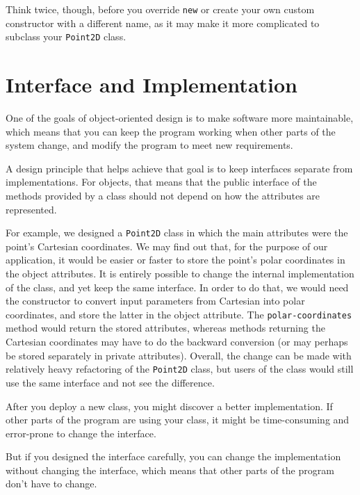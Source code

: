 Think twice, though, before you override {\tt new} or create your 
own custom constructor with a different name, as it may make it 
more complicated to subclass your {\tt Point2D} class.



\section{Interface and Implementation}

One of the goals of object-oriented design is to make software more
maintainable, which means that you can keep the program working when
other parts of the system change, and modify the program to meet new
requirements.

A design principle that helps achieve that goal is to keep
interfaces separate from implementations.  For objects, that means
that the public interface of the methods provided by a class 
should not depend on how the attributes are represented.

For example, we designed a {\tt Point2D} class in which the main 
attributes were the point's Cartesian coordinates. We may find 
out that, for the purpose of our application, it would be easier 
or faster to store the point's polar coordinates in the object 
attributes. It is entirely possible to change the internal 
implementation of the class, and yet keep the same interface. 
In order to do that, we would need the constructor 
to convert input parameters from 
Cartesian into polar coordinates, and store the latter in the 
object attribute. The {\tt polar-coordinates} method would 
return the stored attributes, whereas methods returning the 
Cartesian coordinates may have to do the backward conversion 
(or may perhaps be stored separately in private attributes). 
Overall, the change can be made with relatively heavy refactoring 
of the {\tt Point2D} class, but users of the class would still 
use the same interface and not see the difference.

After you deploy a new class, you might discover a better
implementation.  If other parts of the program are using your
class, it might be time-consuming and error-prone to change the
interface.  

But if you designed the interface carefully, you can
change the implementation without changing the interface, which
means that other parts of the program don't have to change.


